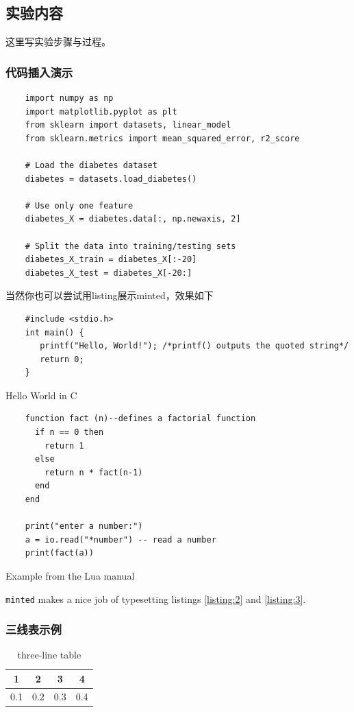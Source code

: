\documentclass[a4paper,12pt]{ctexart}
\begin{document}
\subsection{实验内容}
这里写实验步骤与过程。
\subsubsection{代码插入演示}

\begin{verbatim}
    import numpy as np
    import matplotlib.pyplot as plt
    from sklearn import datasets, linear_model
    from sklearn.metrics import mean_squared_error, r2_score

    # Load the diabetes dataset
    diabetes = datasets.load_diabetes()

    # Use only one feature
    diabetes_X = diabetes.data[:, np.newaxis, 2]

    # Split the data into training/testing sets
    diabetes_X_train = diabetes_X[:-20]
    diabetes_X_test = diabetes_X[-20:]
\end{verbatim}

当然你也可以尝试用listing展示minted，效果如下
\begin{listing}[!ht]
    \begin{verbatim}
    #include <stdio.h>
    int main() {
       printf("Hello, World!"); /*printf() outputs the quoted string*/
       return 0;
    }
    \end{verbatim}
    \caption{Hello World in C}
    \label{listing:2}
\end{listing}

\begin{listing}[!ht]
    \begin{verbatim}
    function fact (n)--defines a factorial function
      if n == 0 then
        return 1
      else
        return n * fact(n-1)
      end
    end
    
    print("enter a number:")
    a = io.read("*number") -- read a number
    print(fact(a))
    \end{verbatim}
    \caption{Example from the Lua manual}
    \label{listing:3}
\end{listing}
\noindent\texttt{minted} makes a nice job of typesetting listings \ref{listing:2} and \ref{listing:3}.
\subsubsection{三线表示例}
\begin{table}[htbp]
    \centering
    \caption{three-line table}
    \begin{tabular}{cccc}
        \toprule  %
        1   & 2   & 3   & 4   \\
        \midrule  %
        0.1 & 0.2 & 0.3 & 0.4 \\
        \bottomrule  %
    \end{tabular}
\end{table}
\end{document}
